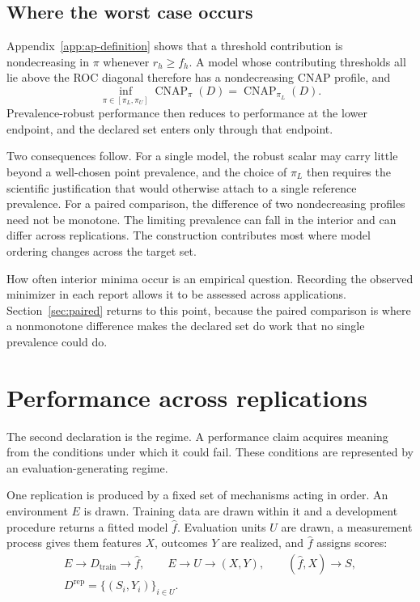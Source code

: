 \documentclass[11pt]{article}
\newcommand{\CNAP}{\operatorname{CNAP}}
\theoremstyle{remark}
\begin{document}
\subsection{Where the worst case occurs}
\label{sec:worst-case}

Appendix~\ref{app:ap-definition} shows that a threshold contribution is nondecreasing in $\pi$ whenever $r_h\geq f_h$. A model whose contributing thresholds all lie above the ROC diagonal therefore has a nondecreasing CNAP profile, and
\[
\inf_{\pi\in[\pi_L,\pi_U]}\CNAP_\pi(D)
=
\CNAP_{\pi_L}(D).
\]
Prevalence-robust performance then reduces to performance at the lower endpoint, and the declared set enters only through that endpoint.

Two consequences follow. For a single model, the robust scalar may carry little beyond a well-chosen point prevalence, and the choice of $\pi_L$ then requires the scientific justification that would otherwise attach to a single reference prevalence. For a paired comparison, the difference of two nondecreasing profiles need not be monotone. The limiting prevalence can fall in the interior and can differ across replications. The construction contributes most where model ordering changes across the target set.

How often interior minima occur is an empirical question. Recording the observed minimizer in each report allows it to be assessed across applications. Section~\ref{sec:paired} returns to this point, because the paired comparison is where a nonmonotone difference makes the declared set do work that no single prevalence could do.

\section{Performance across replications}
\label{sec:regime}

The second declaration is the regime. A performance claim acquires meaning from the conditions under which it could fail. These conditions are represented by an evaluation-generating regime.

One replication is produced by a fixed set of mechanisms acting in order. An environment $E$ is drawn. Training data are drawn within it and a development procedure returns a fitted model $\widehat f$. Evaluation units $U$ are drawn, a measurement process gives them features $X$, outcomes $Y$ are realized, and $\widehat f$ assigns scores:
\begin{equation}
\begin{gathered}
E\longrightarrow D_{\mathrm{train}}\longrightarrow\widehat f,
\qquad
E\longrightarrow U\longrightarrow(X,Y),
\qquad
(\widehat f,X)\longrightarrow S,
\\
D^{\mathrm{rep}}=\{(S_i,Y_i)\}_{i\in U}.
\end{gathered}
\label{eq:regime-graph}
\end{equation}
\end{document}
